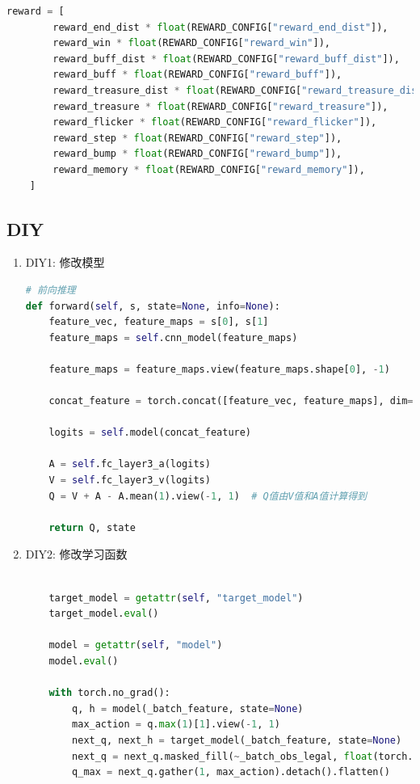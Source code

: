 \begin{enumerate}
\begin{lstlisting}[language=Python]
    reward = [
        reward_end_dist * float(REWARD_CONFIG["reward_end_dist"]),
        reward_win * float(REWARD_CONFIG["reward_win"]),
        reward_buff_dist * float(REWARD_CONFIG["reward_buff_dist"]),
        reward_buff * float(REWARD_CONFIG["reward_buff"]),
        reward_treasure_dist * float(REWARD_CONFIG["reward_treasure_dists"]),
        reward_treasure * float(REWARD_CONFIG["reward_treasure"]),
        reward_flicker * float(REWARD_CONFIG["reward_flicker"]),
        reward_step * float(REWARD_CONFIG["reward_step"]),
        reward_bump * float(REWARD_CONFIG["reward_bump"]),
        reward_memory * float(REWARD_CONFIG["reward_memory"]),
    ]
\end{lstlisting}


\end{enumerate}



\subsection{DIY}

\begin{enumerate}
\item DIY1: 修改模型

\begin{lstlisting}[language=Python]
# 前向推理
def forward(self, s, state=None, info=None):
    feature_vec, feature_maps = s[0], s[1]
    feature_maps = self.cnn_model(feature_maps)

    feature_maps = feature_maps.view(feature_maps.shape[0], -1)

    concat_feature = torch.concat([feature_vec, feature_maps], dim=1)

    logits = self.model(concat_feature)

    A = self.fc_layer3_a(logits)
    V = self.fc_layer3_v(logits)
    Q = V + A - A.mean(1).view(-1, 1)  # Q值由V值和A值计算得到

    return Q, state
\end{lstlisting}


\item DIY2: 修改学习函数

\begin{lstlisting}[language=Python]
 
    target_model = getattr(self, "target_model")
    target_model.eval()

    model = getattr(self, "model")
    model.eval()

    with torch.no_grad():
        q, h = model(_batch_feature, state=None)
        max_action = q.max(1)[1].view(-1, 1)
        next_q, next_h = target_model(_batch_feature, state=None)
        next_q = next_q.masked_fill(~_batch_obs_legal, float(torch.min(next_q)))
        q_max = next_q.gather(1, max_action).detach().flatten()
\end{lstlisting}

\end{enumerate}